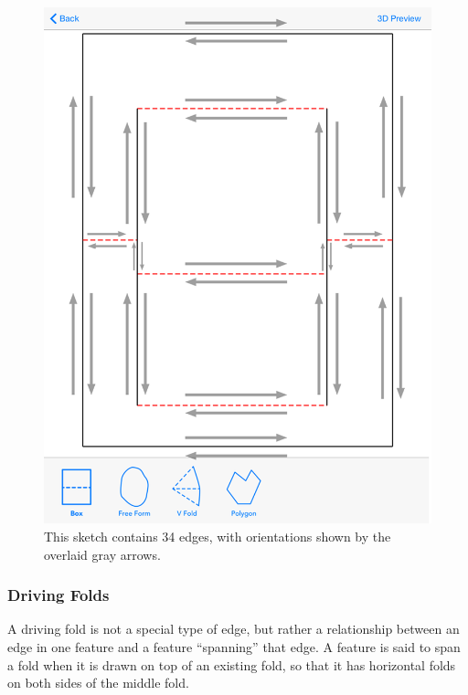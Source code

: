 \begin{figure}[htbp]
\centering
\includegraphics{figures/33_UI_Interface_Data_Structures/boxfold_34_edges.png}
\caption{This sketch contains 34 edges, with orientations shown by the
overlaid gray arrows.}
\end{figure}

\subsubsection{Driving Folds}\label{driving-folds}

A driving fold is not a special type of edge, but rather a relationship
between an edge in one feature and a feature ``spanning'' that edge. A
feature is said to span a fold when it is drawn on top of an existing
fold, so that it has horizontal folds on both sides of the middle fold.

